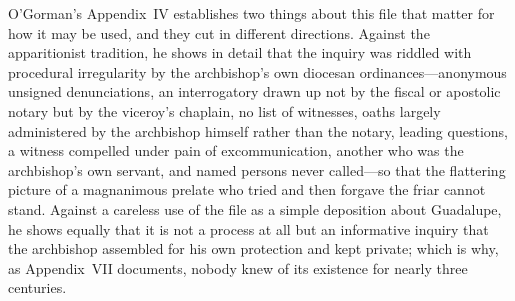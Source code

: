 O'Gorman's Appendix~IV establishes two things about this file that
matter for how it may be used, and they cut in different directions.
Against the apparitionist tradition, he shows in detail that the
inquiry was riddled with procedural irregularity by the archbishop's
own diocesan ordinances---anonymous unsigned denunciations, an
interrogatory drawn up not by the fiscal or apostolic notary but by
the viceroy's chaplain, no list of witnesses, oaths largely
administered by the archbishop himself rather than the notary,
leading questions, a witness compelled under pain of excommunication,
another who was the archbishop's own servant, and named persons never
called---so that the flattering picture of a magnanimous prelate who
tried and then forgave the friar cannot stand. Against a careless use
of the file as a simple deposition about Guadalupe, he shows equally
that it is not a process at all but an informative inquiry that the
archbishop assembled for his own protection and kept private; which
is why, as Appendix~VII documents, nobody knew of its existence for
nearly three centuries.

